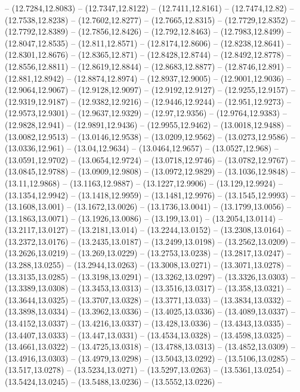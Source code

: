 {-- (12.7284,12.8083) -- (12.7347,12.8122) -- (12.7411,12.8161) -- (12.7474,12.82) -- (12.7538,12.8238) -- (12.7602,12.8277) -- (12.7665,12.8315) -- (12.7729,12.8352) -- (12.7792,12.8389) -- (12.7856,12.8426) -- (12.792,12.8463) -- (12.7983,12.8499)
-- (12.8047,12.8535) -- (12.811,12.8571) -- (12.8174,12.8606) -- (12.8238,12.8641) -- (12.8301,12.8676) -- (12.8365,12.871) -- (12.8428,12.8744) -- (12.8492,12.8778) -- (12.8556,12.8811) -- (12.8619,12.8844) -- (12.8683,12.8877) -- (12.8746,12.891)
-- (12.881,12.8942) -- (12.8874,12.8974) -- (12.8937,12.9005) -- (12.9001,12.9036) -- (12.9064,12.9067) -- (12.9128,12.9097) -- (12.9192,12.9127) -- (12.9255,12.9157) -- (12.9319,12.9187) -- (12.9382,12.9216) -- (12.9446,12.9244) -- (12.951,12.9273)
-- (12.9573,12.9301) -- (12.9637,12.9329) -- (12.97,12.9356) -- (12.9764,12.9383) -- (12.9828,12.941) -- (12.9891,12.9436) -- (12.9955,12.9462) -- (13.0018,12.9488) -- (13.0082,12.9513) -- (13.0146,12.9538) -- (13.0209,12.9562) -- (13.0273,12.9586)
-- (13.0336,12.961) -- (13.04,12.9634) -- (13.0464,12.9657) -- (13.0527,12.968) -- (13.0591,12.9702) -- (13.0654,12.9724) -- (13.0718,12.9746) -- (13.0782,12.9767) -- (13.0845,12.9788) -- (13.0909,12.9808) -- (13.0972,12.9829) -- (13.1036,12.9848)
-- (13.11,12.9868) -- (13.1163,12.9887) -- (13.1227,12.9906) -- (13.129,12.9924) -- (13.1354,12.9942) -- (13.1418,12.9959) -- (13.1481,12.9976) -- (13.1545,12.9993) -- (13.1608,13.001) -- (13.1672,13.0026) -- (13.1736,13.0041) -- (13.1799,13.0056)
-- (13.1863,13.0071) -- (13.1926,13.0086) -- (13.199,13.01) -- (13.2054,13.0114) -- (13.2117,13.0127) -- (13.2181,13.014) -- (13.2244,13.0152) -- (13.2308,13.0164) -- (13.2372,13.0176) -- (13.2435,13.0187) -- (13.2499,13.0198) -- (13.2562,13.0209)
-- (13.2626,13.0219) -- (13.269,13.0229) -- (13.2753,13.0238) -- (13.2817,13.0247) -- (13.288,13.0255) -- (13.2944,13.0263) -- (13.3008,13.0271) -- (13.3071,13.0278) -- (13.3135,13.0285) -- (13.3198,13.0291) -- (13.3262,13.0297) -- (13.3326,13.0303)
-- (13.3389,13.0308) -- (13.3453,13.0313) -- (13.3516,13.0317) -- (13.358,13.0321) -- (13.3644,13.0325) -- (13.3707,13.0328) -- (13.3771,13.033) -- (13.3834,13.0332) -- (13.3898,13.0334) -- (13.3962,13.0336) -- (13.4025,13.0336) -- (13.4089,13.0337)
-- (13.4152,13.0337) -- (13.4216,13.0337) -- (13.428,13.0336) -- (13.4343,13.0335) -- (13.4407,13.0333) -- (13.447,13.0331) -- (13.4534,13.0328) -- (13.4598,13.0325) -- (13.4661,13.0322) -- (13.4725,13.0318) -- (13.4788,13.0313) -- (13.4852,13.0309)
-- (13.4916,13.0303) -- (13.4979,13.0298) -- (13.5043,13.0292) -- (13.5106,13.0285) -- (13.517,13.0278) -- (13.5234,13.0271) -- (13.5297,13.0263) -- (13.5361,13.0254) -- (13.5424,13.0245) -- (13.5488,13.0236) -- (13.5552,13.0226) --
}
